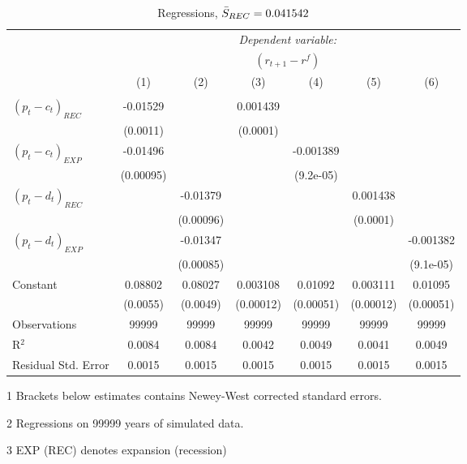 \begin{table}[H]
\centering   
  \caption{Regressions, $\Bar{S}_{REC} = 0.041542$}           
  \label{tab:regress1}     
  \begin{threeparttable}
\begin{tabular}{@{\hspace{5pt}}l@{\hspace{5pt}}cccccc} 
\toprule 
 & \multicolumn{6}{c}{\textit{Dependent variable:}} \\ 
 & \multicolumn{6}{c}{$\left(r_{t+1}-r^f\right)$} \\ 
 \cmidrule(rr){2-7}
 & (1) & (2) & (3) & (4) & (5) & (6) \\ 
\midrule  
\\[-2.1ex] $\left( p_t - c_t \right)_{REC}$ &-0.01529& &0.001439 & & &\\ 
  & (0.0011) & &(0.0001) & & & \\ 
 \addlinespace 
  $\left( p_t - c_t \right)_{EXP}$ &-0.01496  &    & &-0.001389 & &  \\ 
  & (0.00095) & & &(9.2e-05) & & \\ 
 \addlinespace 
  $\left( p_t - d_t \right)_{REC}$ & &-0.01379& & & 0.001438  &   \\ 
                                   & &  (0.00096) & & & (0.0001) &    \\ 
 \addlinespace 
  $\left( p_t - d_t \right)_{EXP}$ & &   -0.01347& & & &-0.001382 \\ 
                                   & &  (0.00085) & & & &(9.1e-05) \\ 
 \addlinespace 
 Constant &0.08802 &0.08027&0.003108 &0.01092 &0.003111 &0.01095 \\ 
          &(0.0055) &(0.0049)&(0.00012)&(0.00051)&(0.00012)&(0.00051) \\ 
 \addlinespace 
\midrule  
Observations & 99999 & 99999&99999 & 99999&99999&99999\\
R$^{2}$ &0.0084 & 0.0084&0.0042&0.0049&0.0041&0.0049 \\ 
Residual Std. Error &0.0015 & 0.0015&0.0015&0.0015&0.0015&0.0015 \\ 
\bottomrule 
\end{tabular} 
\begin{tablenotes}
\footnotesize{
\item[1] Brackets below estimates contains Newey-West corrected standard errors. 
\item[2] Regressions on 99999 years of simulated data.
\item[3] EXP (REC) denotes expansion (recession)
}
\end{tablenotes}
\end{threeparttable}
\end{table} 
